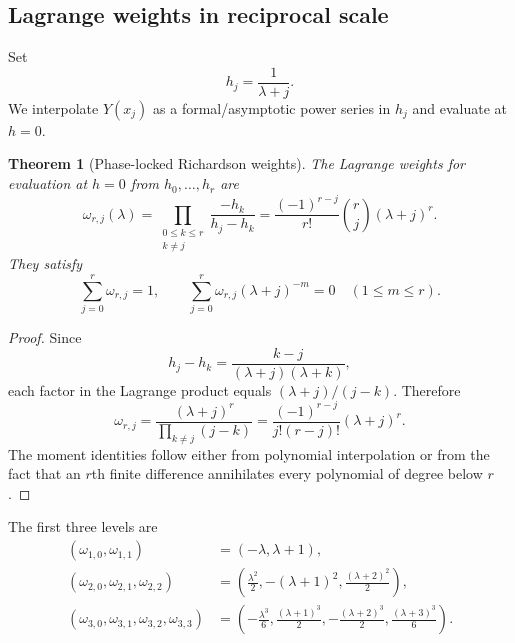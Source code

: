 \documentclass[11pt]{article}
\numberwithin{equation}{section}
\newtheorem{theorem}{Theorem}[section]
\theoremstyle{definition}
\theoremstyle{remark}
\begin{document}
\subsection{Lagrange weights in reciprocal scale}

Set
\begin{equation}
h_j=\frac1{\lambda+j}.
\label{p8:eq:h-nodes}
\end{equation}
We interpolate $Y(x_j)$ as a formal/asymptotic power series in $h_j$ and evaluate at $h=0$.

\begin{theorem}[Phase-locked Richardson weights]
\label{p8:thm:lambert-weights}
The Lagrange weights for evaluation at $h=0$ from $h_0,\ldots,h_r$ are
\begin{equation}
\boxed{
\omega_{r,j}(\lambda)
=\prod_{\substack{0\le k\le r\\k\ne j}}
\frac{-h_k}{h_j-h_k}
=\frac{(-1)^{r-j}}{r!}\binom{r}{j}(\lambda+j)^r.}
\label{p8:eq:omega}
\end{equation}
They satisfy
\begin{equation}
\sum_{j=0}^{r}\omega_{r,j}=1,
\qquad
\sum_{j=0}^{r}\omega_{r,j}(\lambda+j)^{-m}=0
\quad(1\le m\le r).
\label{p8:eq:omega-cancel}
\end{equation}
\end{theorem}

\begin{proof}
Since
\[
h_j-h_k=\frac{k-j}{(\lambda+j)(\lambda+k)},
\]
each factor in the Lagrange product equals $(\lambda+j)/(j-k)$. Therefore
\[
\omega_{r,j}=\frac{(\lambda+j)^r}
{\prod_{k\ne j}(j-k)}
=\frac{(-1)^{r-j}}{j!(r-j)!}(\lambda+j)^r.
\]
The moment identities follow either from polynomial interpolation or from the fact that an $r$th finite difference annihilates every polynomial of degree below $r$.
\end{proof}

The first three levels are
\begin{align}
(\omega_{1,0},\omega_{1,1})
&=(-\lambda,\lambda+1),
\label{p8:eq:omega1}\\
(\omega_{2,0},\omega_{2,1},\omega_{2,2})
&=\left(\frac{\lambda^2}{2},-(\lambda+1)^2,
\frac{(\lambda+2)^2}{2}\right),
\label{p8:eq:omega2}\\
(\omega_{3,0},\omega_{3,1},\omega_{3,2},\omega_{3,3})
&=\left(-\frac{\lambda^3}{6},\frac{(\lambda+1)^3}{2},
-\frac{(\lambda+2)^3}{2},\frac{(\lambda+3)^3}{6}\right).
\label{p8:eq:omega3}
\end{align}
\end{document}

